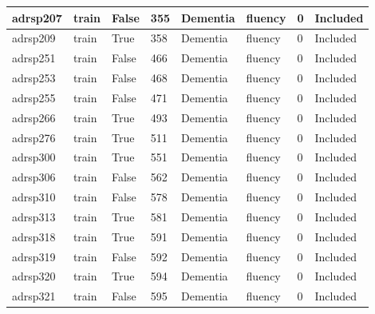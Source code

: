 \begin{center}
\begin{longtable}{|l|l|l|l|l|l|l|l|}
adrsp207       & train                 & False             & 355     & Dementia       & fluency         & 0            & Included      \\ \hline
adrsp209       & train                 & True              & 358     & Dementia       & fluency         & 0            & Included      \\ \hline
adrsp251       & train                 & False             & 466     & Dementia       & fluency         & 0            & Included      \\ \hline
adrsp253       & train                 & False             & 468     & Dementia       & fluency         & 0            & Included      \\ \hline
adrsp255       & train                 & False             & 471     & Dementia       & fluency         & 0            & Included      \\ \hline
adrsp266       & train                 & True              & 493     & Dementia       & fluency         & 0            & Included      \\ \hline
adrsp276       & train                 & True              & 511     & Dementia       & fluency         & 0            & Included      \\ \hline
adrsp300       & train                 & True              & 551     & Dementia       & fluency         & 0            & Included      \\ \hline
adrsp306       & train                 & False             & 562     & Dementia       & fluency         & 0            & Included      \\ \hline
adrsp310       & train                 & False             & 578     & Dementia       & fluency         & 0            & Included      \\ \hline
adrsp313       & train                 & True              & 581     & Dementia       & fluency         & 0            & Included      \\ \hline
adrsp318       & train                 & True              & 591     & Dementia       & fluency         & 0            & Included      \\ \hline
adrsp319       & train                 & False             & 592     & Dementia       & fluency         & 0            & Included      \\ \hline
adrsp320       & train                 & True              & 594     & Dementia       & fluency         & 0            & Included      \\ \hline
adrsp321       & train                 & False             & 595     & Dementia       & fluency         & 0            & Included      \\ \hline

\end{longtable}
\end{center}

